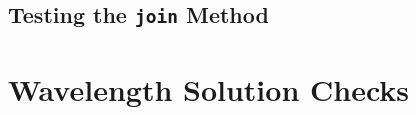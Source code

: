 

\subsection{Testing the \texttt{join} Method} \label{subsec:test_join}





\section{Wavelength Solution Checks} \label{sec:test_wav}


